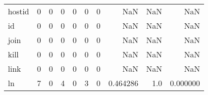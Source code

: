 \begin{tabular}{lrrrrrrrrr}
hostid    &                                                  0 &                                                  0 &                                                  0 &                                                  0 &                                                  0 &                                                  0 &                                                NaN &                                    NaN &                                  NaN \\
id        &                                                  0 &                                                  0 &                                                  0 &                                                  0 &                                                  0 &                                                  0 &                                                NaN &                                    NaN &                                  NaN \\
join      &                                                  0 &                                                  0 &                                                  0 &                                                  0 &                                                  0 &                                                  0 &                                                NaN &                                    NaN &                                  NaN \\
kill      &                                                  0 &                                                  0 &                                                  0 &                                                  0 &                                                  0 &                                                  0 &                                                NaN &                                    NaN &                                  NaN \\
link      &                                                  0 &                                                  0 &                                                  0 &                                                  0 &                                                  0 &                                                  0 &                                                NaN &                                    NaN &                                  NaN \\
ln        &                                                  7 &                                                  0 &                                                  4 &                                                  0 &                                                  3 &                                                  0 &                                           0.464286 &                                    1.0 &                             0.000000 \\

\end{tabular}
